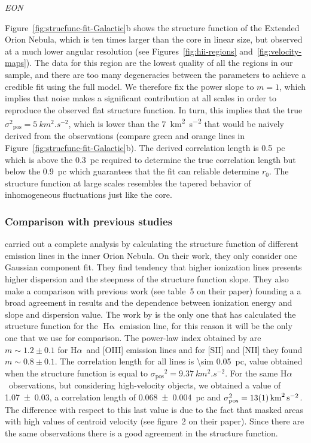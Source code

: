 \documentclass[fleqn,usenatbib, useAMS, a4paper]{mnras}
\newcommand\pos{\ensuremath{_{\mathrm{pos}}}}
\newcommand\halpha{H${\alpha}$}
\newcommand\ha{\ensuremath{\text{H}\upalpha}}
\begin{document}
\textit{EON}

Figure~\ref{fig:strucfunc-fit-Galactic}b shows the structure function of the Extended Orion Nebula, which is ten times larger than the core in linear size,
but observed at a much lower angular resolution
(see Figures~\ref{fig:hii-regions} and~\ref{fig:velocity-maps}).
The data for this region are the lowest quality of all the regions in
our sample, and there are too many degeneracies between the parameters
to achieve a credible fit using the full model.
We therefore fix the power slope to \(m = 1\),
which implies that noise makes a significant contribution at all scales
in order to reproduce the observed flat structure function.
In turn, this implies that the true \(\sigma^2\pos = \SI{5}{km^2.s^{-2}}\),
which is lower than the \SI{7}{km^2.s^{-2}}
that would be naively derived from the observations
(compare green and orange lines in Figure~\ref{fig:strucfunc-fit-Galactic}b).
The derived correlation length is \SI{0.5}{pc} which is above the \SI{0.3}{pc} required to determine the true correlation length but below the \SI{0.9}{pc} which guarantees that the fit can reliable determine \(r_0\). 
The structure function at large scales resembles the tapered behavior of inhomogeneous fluctuations just like the core.


\subsubsection{Comparison with previous studies}
\label{sec:comparison-orion}

\citet{arthur2016turbulence} carried out a complete analysis by calculating the structure function of different emission lines in the inner Orion Nebula.
On their work, they only consider one Gaussian component fit.
They find tendency that higher ionization lines presents higher  dispersion and the steepness of the structure function slope. 
They also make a comparison with previous work (see table~5 on their paper) founding a a broad agreement in results and the dependence between ionization energy and slope and dispersion value.
The work by \citet{arthur2016turbulence} is the only one that has calculated the structure function for the \ha{} emission line, for this reason it will be the only one that we use for comparison.
The power-law index obtained by \citet{arthur2016turbulence} are \(m \sim 1.2 \pm 0.1\) for \halpha\ and [OIII] emission lines and for [SII] and [NII] they found \(m \sim 0.8 \pm 0.1\). 
The correlation length for all lines is \SI{\sim 0.05}{pc}, value obtained when the structure function is equal to \(\sigma\pos^2= \SI{9.37}{km^{2 }.s^{-2}}\).
For the same \halpha\ observations, but considering high-velocity objects, we obtained a value of \num{1.07 \pm 0.03}, a correlation length of \SI{0.068 \pm 0.004}{pc} and \(\sigma\pos^2 = \SI{13 \pm 1}{ km^{2}.s^{-2}}\). 
The difference with respect to this last value is due to the fact that \citet{arthur2016turbulence} masked areas with high values of centroid velocity (see figure~2 on their paper).
Since there are the same observations there is a good agreement in the structure function.
\end{document}
